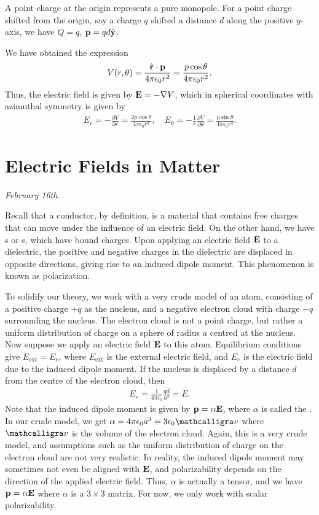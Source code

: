 A point charge at the origin represents a pure monopole. For a point charge shifted from the origin, say a charge $q$ shifted a distance $d$ along the positive $y$-axis, we have $Q = q$, $\mathbf{p} = q d \hat{\mathbf{y}}$.

We have obtained the expression
\begin{align}
    V(r,\theta) = \frac{\hat{\mathbf{r}} \cdot \mathbf{p}}{4 \pi \epsilon_{0} r^{2}} = \frac{p \cos \theta}{4 \pi \epsilon_{0} r^{2}}.
\end{align}
Thus, the electric field is given by $\mathbf{E} = -\nabla V$, which in spherical coordinates with azimuthal symmetry is given by
\begin{align}
    E_{r} = -\frac{\partial V}{\partial r} = \frac{2 p \cos \theta}{4 \pi \epsilon_{0} r^{3}}, \quad E_{\theta} = -\frac{1}{r} \frac{\partial V}{\partial \theta} = \frac{p \sin \theta}{4 \pi \epsilon_{0} r^{3}}.
\end{align}


\section{Electric Fields in Matter}
\textit{February 16th.}

Recall that a conductor, by definition, is a material that contains free charges that can move under the influence of an electric field. On the other hand, we have s or s, which have bound charges. Upon applying an electric field $\mathbf{E}$ to a dielectric, the positive and negative charges in the dielectric are displaced in opposite directions, giving rise to an induced dipole moment. This phenomenon is known as polarization.

To solidify our theory, we work with a very crude model of an atom, consisting of a positive charge $+q$ as the nucleus, and a negative electron cloud with charge $-q$ surrounding the nucleus. The electron cloud is not a point charge, but rather a uniform distribution of charge on a sphere of radius $a$ centred at the nucleus. Now suppose we apply an electric field $\mathbf{E}$ to this atom. Equilibrium conditions give $E_{\text{ext}} = E_{e}$, where $E_{\text{ext}}$ is the external electric field, and $E_{e}$ is the electric field due to the induced dipole moment. If the nucleus is displaced by a distance $d$ from the centre of the electron cloud, then
\begin{align}
    E_{e} = \frac{1}{4 \pi \epsilon_{0}} \frac{qd}{a^{3}} = E.
\end{align}
Note that the induced dipole moment is given by $\mathbf{p} = \alpha \mathbf{E}$, where $\alpha$ is called the . In our crude model, we get $\alpha = 4 \pi \epsilon_{0} a^{3} = 3\epsilon_{0} \curs{v}$ where $\curs{v}$ is the volume of the electron cloud. Again, this is a very crude model, and assumptions such as the uniform distribution of charge on the electron cloud are not very realistic. In reality, the induced dipole moment may sometimes not even be aligned with $\mathbf{E}$, and polarizability depends on the direction of the applied electric field. Thus, $\alpha$ is actually a tensor, and we have $\mathbf{p} = \alpha \mathbf{E}$ where $\alpha$ is a $3 \times 3$ matrix. For now, we only work with scalar polarizability.

